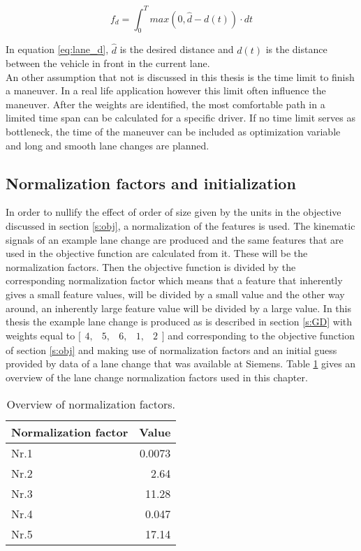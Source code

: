 \begin{equation}\label{eq:lane_d}
f_d= \int_{0}^{T} max(0,\hat{d}-d(t))\cdot dt
\end{equation}

In equation \ref{eq:lane_d}, $\hat{d}$ is the desired distance and $d(t)$ is the distance between the vehicle in front in the current lane.\\


An other assumption that not is discussed in this thesis is the time limit to finish a maneuver. In a real life application however this limit often influence the maneuver. After the weights are identified, the most comfortable path in a limited time span can be calculated for a specific driver. If no time limit serves as bottleneck, the time of the maneuver can be included as optimization variable and long and smooth lane changes are planned. 

\subsection{Normalization factors and initialization} \label{s:norm}
In order to nullify the effect of order of size given by the units in the objective discussed in section \ref{s:obj}, a normalization of the features is used. The kinematic signals of an example lane change are produced and the same features that are used in the objective function are calculated from it. These will be the normalization factors. Then the objective function is divided by the corresponding normalization factor which means that a feature that inherently gives a small feature values, will be divided by a small value and the other way around, an inherently large feature value will be divided by a large value. In this thesis the example lane change is produced as is described in section \ref{s:GD} with weights equal to $ \bigl[ \begin{smallmatrix} 4,&5,&6,&1,&2\end{smallmatrix}\bigr]$ and corresponding to the objective function of section \ref{s:obj} and making use of normalization factors and an initial guess provided by data of a lane change that was available at Siemens. Table \ref{table:norm} gives an overview of the lane change normalization factors used in this chapter. 

\begin{table}[h!]\label{table:norm}
  \centering
  \begin{tabular}{@{}lr@{}} 
    Normalization factor    & Value\\ \midrule
    Nr.1      & 0.0073\\
    Nr.2          & 2.64\\
    Nr.3       & 11.28\\
    Nr.4       & 0.047\\
    Nr.5  & 17.14\\ \bottomrule
  \end{tabular}
  \caption{Overview of  normalization factors.}
\end{table}

